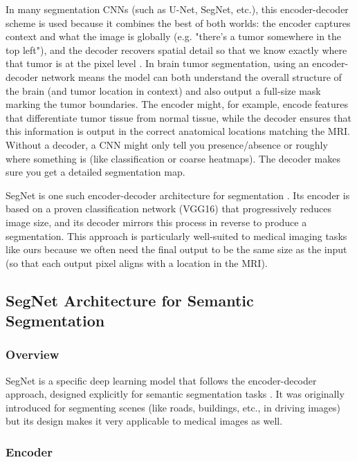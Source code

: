 In many segmentation CNNs (such as U-Net, SegNet, etc.), this encoder-decoder scheme is used because it combines the best of both worlds: the encoder captures context and what the image is globally (e.g. "there's a tumor somewhere in the top left"), and the decoder recovers spatial detail so that we know exactly where that tumor is at the pixel level \cite{guide2024segmentation}. In brain tumor segmentation, using an encoder-decoder network means the model can both understand the overall structure of the brain (and tumor location in context) and also output a full-size mask marking the tumor boundaries. The encoder might, for example, encode features that differentiate tumor tissue from normal tissue, while the decoder ensures that this information is output in the correct anatomical locations matching the MRI. Without a decoder, a CNN might only tell you presence/absence or roughly where something is (like classification or coarse heatmaps). The decoder makes sure you get a detailed segmentation map.

SegNet is one such encoder-decoder architecture for segmentation \cite{paperswithcode2023segnet}. Its encoder is based on a proven classification network (VGG16) that progressively reduces image size, and its decoder mirrors this process in reverse to produce a segmentation. This approach is particularly well-suited to medical imaging tasks like ours because we often need the final output to be the same size as the input (so that each output pixel aligns with a location in the MRI).

\subsection{SegNet Architecture for Semantic Segmentation}
\label{sec:segnet_architecture}

\subsubsection{Overview}
\label{sec:segnet_overview_section}

SegNet is a specific deep learning model that follows the encoder-decoder approach, designed explicitly for semantic segmentation tasks \cite{paperswithcode2023segnet}. It was originally introduced for segmenting scenes (like roads, buildings, etc., in driving images) but its design makes it very applicable to medical images as well.

\subsubsection{Encoder}
\label{sec:segnet_encoder}

